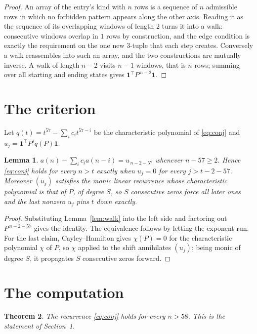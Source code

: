 \documentclass[11pt,a4paper]{article}
\theoremstyle{plain}
\newtheorem{theorem}{Theorem}
\newtheorem{lemma}[theorem]{Lemma}
\theoremstyle{definition}
\begin{document}
\begin{proof}
An array of the entry's kind with $n$ rows is a sequence of $n$ admissible rows in
which no forbidden pattern appears along the other axis. Reading it as the sequence of its
overlapping windows of length $2$ turns it into a walk: consecutive windows overlap in
$1$ rows by construction, and the edge condition is exactly the requirement on the one
new $3$-tuple that each step creates. Conversely a walk reassembles into such an array,
and the two constructions are mutually inverse. A walk of length $n-2$ visits $n-1$
windows, that is $n$ rows; summing over all starting and ending states gives
$\mathbf{1}^{\!\top}P^{\,n-2}\mathbf{1}$.
\end{proof}

\section{The criterion}

Let $q(t)=t^{57}-\sum_i c_i t^{57-i}$ be the characteristic polynomial of
\eqref{eq:conj} and $u_j=\mathbf{1}^{\!\top}P^{j}q(P)\mathbf{1}$.

\begin{lemma}\label{lem:crit}
$a(n)-\sum_i c_i a(n-i)=u_{\,n-2-57}$ whenever $n-57\ge2$. Hence
\eqref{eq:conj} holds for every $n>t$ exactly when $u_j=0$ for every
$j>t-2-57$. Moreover $(u_j)$ satisfies the monic linear recurrence whose
characteristic polynomial is that of $P$, of degree $S$, so $S$ consecutive zeros force all
later ones and the last nonzero $u_j$ pins $t$ down exactly.
\end{lemma}

\begin{proof}
Substituting Lemma~\ref{lem:walk} into the left side and factoring out
$P^{\,n-2-57}$ gives the identity. The equivalence follows by letting the exponent
run. For the last claim, Cayley--Hamilton gives $\chi(P)=0$ for the characteristic
polynomial $\chi$ of $P$, so $\chi$ applied to the shift annihilates $(u_j)$; being monic of
degree $S$, it propagates $S$ consecutive zeros forward.
\end{proof}

\section{The computation}

\begin{theorem}
The recurrence \eqref{eq:conj} holds for every $n>58$. This is the statement of
Section~1.
\end{theorem}
\end{document}
